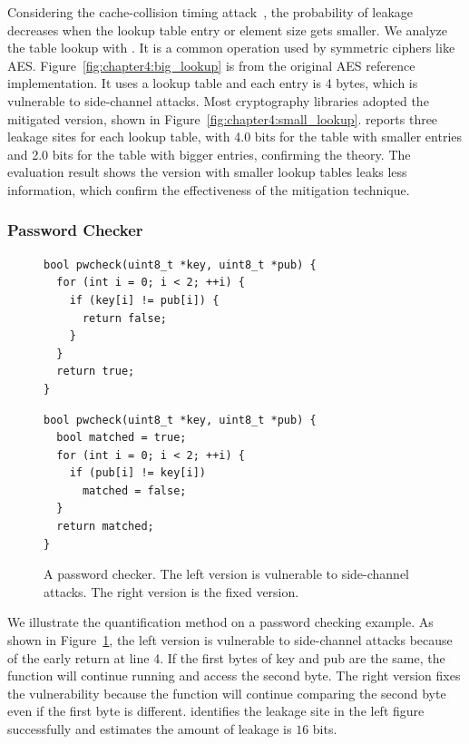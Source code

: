 Considering the cache-collision timing attack~\cite{Bonneau11894063_16}, the
probability of leakage decreases when the lookup table entry or element size gets
smaller. We analyze the table lookup with \tool{}. It is a common operation used by symmetric ciphers like AES. Figure~\ref{fig:chapter4:big_lookup} is from the original AES reference implementation. It uses a lookup table and each entry is 4 bytes, which is vulnerable to side-channel attacks. Most cryptography libraries adopted the mitigated version, shown in Figure~\ref{fig:chapter4:small_lookup}. \tool{} reports three leakage sites for
each lookup table, with 4.0 bits for the table with smaller entries and 2.0
bits for the table with bigger entries, confirming the theory.
The evaluation result shows the version with smaller lookup tables leaks less information, which confirm the effectiveness of the mitigation technique. 



\subsubsection*{Password Checker}
\begin{figure}
  \begin{minipage}{0.45\linewidth}
    \begin{lstlisting}[xleftmargin=.0\textwidth, xrightmargin=.0\textwidth, frame=none]
bool pwcheck(uint8_t *key, uint8_t *pub) {
  for (int i = 0; i < 2; ++i) {
    if (key[i] != pub[i]) {
      return false;
    }
  }
  return true;
}
\end{lstlisting}
  \end{minipage}
  \hfill
  \begin{minipage}{0.45\linewidth}
    \begin{lstlisting}[xleftmargin=.0\textwidth, xrightmargin=.00\textwidth, frame=none]
bool pwcheck(uint8_t *key, uint8_t *pub) {
  bool matched = true;
  for (int i = 0; i < 2; ++i) {
    if (pub[i] != key[i]) 
      matched = false;
  }
  return matched;
}
\end{lstlisting}
  \end{minipage}
  \caption{A password checker. The left version is vulnerable to side-channel attacks. The right version is the fixed version.}\label{fig:chapter4:pwcheck}
\end{figure}

We illustrate the quantification method on a password checking example.  As shown in Figure~\ref{fig:chapter4:pwcheck}, the left version is vulnerable to side-channel attacks because of the early return at line 4. If the first bytes of \textsf{key} and \textsf{pub} are the same, the function will continue running and access the second byte. The right version fixes the vulnerability because the function will continue comparing the second byte even if the first byte is different.  \tool{} identifies the leakage site in the left figure successfully and estimates the amount of leakage is $16$ bits. 



